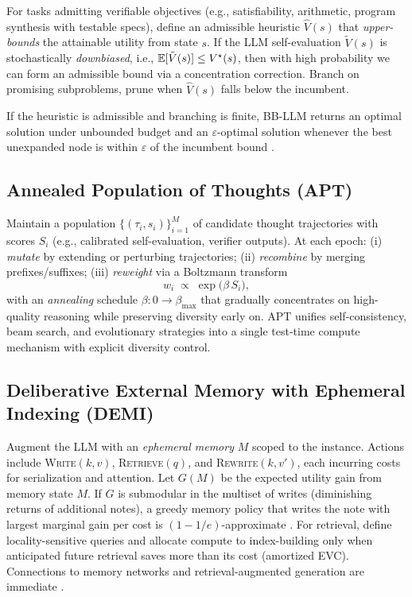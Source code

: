 For tasks admitting verifiable objectives (e.g., satisfiability, arithmetic, program synthesis with testable specs), define an admissible heuristic $\hat{V}(s)$ that \emph{upper-bounds} the attainable utility from state $s$. If the LLM self-evaluation $\tilde{V}(s)$ is stochastically \emph{downbiased}, i.e., $\mathbb{E}[\tilde{V}(s)] \le V^\star(s)$, then with high probability we can form an admissible bound via a concentration correction. 
Branch on promising subproblems, prune when $\hat{V}(s)$ falls below the incumbent.
\begin{proposition}
If the heuristic is admissible and branching is finite, BB-LLM returns an optimal solution under unbounded budget and an $\varepsilon$-optimal solution whenever the best unexpanded node is within $\varepsilon$ of the incumbent bound \cite{land1960bb}.
\end{proposition}

\subsection{Annealed Population of Thoughts (APT)}

Maintain a population $\{(\tau_i, s_i)\}_{i=1}^M$ of candidate thought trajectories with scores $S_i$ (e.g., calibrated self-evaluation, verifier outputs).
At each epoch: (i) \emph{mutate} by extending or perturbing trajectories; (ii) \emph{recombine} by merging prefixes/suffixes; (iii) \emph{reweight} via a Boltzmann transform
\begin{equation}
w_i \;\propto\; \exp\!\big( \beta\, S_i \big),
\end{equation}
with an \emph{annealing} schedule $\beta: 0 \to \beta_{\max}$ that gradually concentrates on high-quality reasoning while preserving diversity early on.
APT unifies self-consistency, beam search, and evolutionary strategies into a single test-time compute mechanism with explicit diversity control.

\subsection{Deliberative External Memory with Ephemeral Indexing (DEMI)}

Augment the LLM with an \emph{ephemeral memory} $M$ scoped to the instance. Actions include \textsc{Write}$(k,v)$, \textsc{Retrieve}$(q)$, and \textsc{Rewrite}$(k,v')$, each incurring costs for serialization and attention. 
Let $G(M)$ be the expected utility gain from memory state $M$. If $G$ is submodular in the multiset of writes (diminishing returns of additional notes), a greedy memory policy that writes the note with largest marginal gain per cost is $(1-1/e)$-approximate \cite{sviridenko2004}. 
For retrieval, define locality-sensitive queries and allocate compute to index-building only when anticipated future retrieval saves more than its cost (amortized EVC). Connections to memory networks and retrieval-augmented generation are immediate \cite{weston2015memnn,graves2016dnc,lewis2020rag}.

